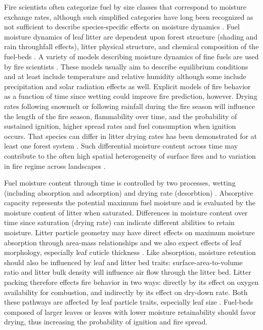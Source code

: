 \documentclass[letterpaper,12pt]{article}
\begin{document}
Fire scientists often categorize fuel by size classes that correspond to
moisture exchange rates, although such simplified categories have long been
recognized as not sufficient to describe species-specific effects on moisture
dynamics \citep{Anderson-1985}. Fuel moisture dynamics of leaf litter are
dependent upon forest structure (shading and rain throughfall effects), litter
physical structure, and chemical composition of the fuel-beds
\citep{Nelson+Hiers-2008, Matthews-2014, Kreye_Hiers_etal-2018}. A variety of
models describing moisture dynamics of fine fuels are used by fire scientists
\citep{Viney-1991, Nelson-2000, Catchpole+Catchpole+etal-2001}. These models
usually aim to describe equilibrium conditions and at least include temperature
and relative humidity although some include precipitation and solar radiation
effects as well. Explicit models of fire behavior as a function of time since
wetting could improve fire prediction, however. Drying rates following snowmelt
or following rainfall during the fire season will influence the length of the
fire season, flammability over time, and the probability of sustained ignition,
higher spread rates and fuel consumption when ignition occurs. That species can
differ in litter drying rates has been demonstrated for at least one forest
system \citep{Kreye+Varner+etal-2013}. Such differential moisture content
across time may contribute to the often high spatial heterogeneity of surface
fires \citep{Hille+Stephens-2005, Knapp+Keeley-2006, Kreye_Hiers_etal-2018} and
to variation in fire regime across landscapes \citep{Stephens-2001}.

Fuel moisture content through time is controlled by two processes, wetting (including absorption and adsorption) and drying rate (desorbtion) \citep{Anderson-1990, Kreye+Kobziar+etal-2013}. Absorptive capacity represents
the potential maximum fuel moisture and is evaluated by the moisture content of
litter when saturated. Differences in moisture content over time since
saturation (drying rate) can indicate different abilities to retain moisture. Litter particle
geometry may have direct effects on maximum moisture absorption through
area-mass relationships and we also expect effects of leaf morphology,
especially leaf cuticle thickness \citep{Van_Wagner-1969}. Like absorption,
moisture retention should also be influenced by leaf and litter bed traits:
surface-area-to-volume ratio and litter bulk density will influence air flow
through the litter bed. Litter packing therefore effects fire behavior in two
ways: directly by its effect on oxygen availability for combustion, and
indirectly by its effect on dry-down rate. Both these pathways are affected by
leaf particle traits, especially leaf size \citep{Scarff+Westoby-2006}.
Fuel-beds composed of larger leaves or leaves with lower moisture retainability should
favor drying, thus increasing the probability of ignition and fire spread.
\end{document}
